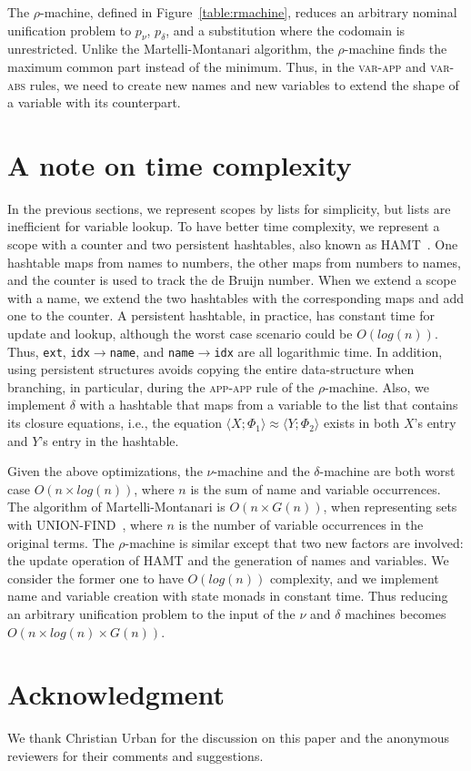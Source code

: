 \documentclass[a4paper,UKenglish]{lipics-v2016}
\newcommand{\clos}[2] {
  \langle #1; #2 \rangle
}
\newcommand{\aeq}[4] {
  \clos{#1}{#2} \approx \clos{#3}{#4}
}
\newcommand*{\transname}[1]{\textsc{#1}}
\begin{document}
The $\rho$-machine, defined in
Figure~\ref{table:rmachine}, 
reduces an arbitrary nominal unification problem to
$p_\nu$, $p_\delta$, and a substitution where the codomain is unrestricted.
Unlike the Martelli-Montanari algorithm,
the $\rho$-machine finds the maximum common part instead of the minimum.
Thus, in the
\transname{var-app} and \transname{var-abs} rules, we need to create
new names and new variables
to extend the shape of a variable with its counterpart.

\section{A note on time complexity}
    \label{efficiency}

In the previous sections, we represent scopes by lists for simplicity,
but lists are inefficient for variable lookup.  To have better time
complexity, we represent a scope with a counter and two persistent
hashtables, also known as HAMT~\citep{bagwell_ideal_2001}.  One
hashtable maps from names to numbers, the other maps from numbers to
names, and the counter is used to track the de Bruijn number.  When we
extend a scope with a name, we extend the two hashtables with the
corresponding maps and add one to the counter.  A persistent
hashtable, in practice, has constant time for update and lookup,
although the worst case scenario could be $O(log(n))$.  Thus,
\texttt{ext}, \texttt{idx$\rightarrow$name}, and
\texttt{name$\rightarrow$idx} are all logarithmic time.  In addition,
using persistent structures avoids copying the entire data-structure
when branching, in particular, during the \transname{app-app} rule of
the $\rho$-machine.
Also, we implement $\delta$ with a hashtable that maps from a variable to
the list that contains its closure equations,
i.e., the equation $\aeq{X}{\Phi_1}{Y}{\Phi_2}$
exists in both $X$'s entry and $Y$'s entry in the hashtable.

Given the above optimizations, the $\nu$-machine and the
$\delta$-machine are both worst case $O(n \times log(n))$,
where $n$ is the sum of name and variable occurrences.
The algorithm of Martelli-Montanari is $O(n \times G(n))$, when
representing sets with UNION-FIND~\citep{tarjan_efficiency_1975}, where
$n$ is the number of variable occurrences in the original terms.  The
$\rho$-machine is similar except that two new factors are involved:
the update operation of HAMT and the generation of names and
variables.  We consider the former one to have $O(log(n))$ complexity,
and we implement name and variable creation with state monads in
constant time.  Thus reducing an arbitrary unification problem to the
input of the $\nu$ and $\delta$ machines becomes $O(n \times log(n) \times
G(n))$.

\section*{Acknowledgment}
We thank Christian Urban for the discussion on this paper
and the anonymous reviewers for their comments and suggestions.


\end{document}
